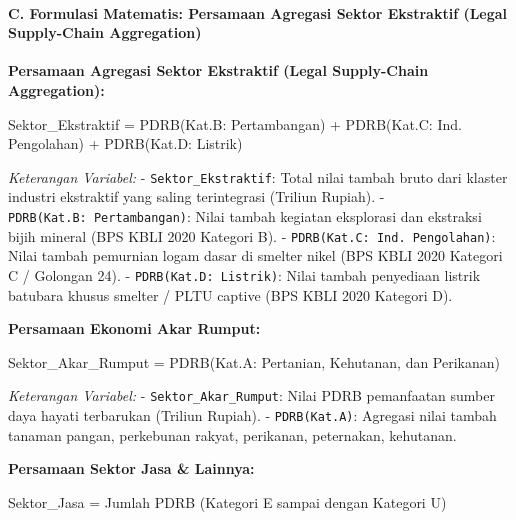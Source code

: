 \documentclass[
]{article}
\newenvironment{Shaded}{}{}
\newcommand{\NormalTok}[1]{#1}
\begin{document}
\paragraph{C. Formulasi Matematis: Persamaan Agregasi Sektor Ekstraktif
(Legal Supply-Chain
Aggregation)}\label{c.-formulasi-matematis-persamaan-agregasi-sektor-ekstraktif-legal-supply-chain-aggregation}

\textbf{Persamaan Agregasi Sektor Ekstraktif (Legal Supply-Chain
Aggregation):}

\begin{Shaded}
\begin{Highlighting}[]
\NormalTok{Sektor\_Ekstraktif = PDRB(Kat.B: Pertambangan) + PDRB(Kat.C: Ind. Pengolahan) + PDRB(Kat.D: Listrik)}
\end{Highlighting}
\end{Shaded}

\emph{Keterangan Variabel:} - \texttt{Sektor\_Ekstraktif}: Total nilai
tambah bruto dari klaster industri ekstraktif yang saling terintegrasi
(Triliun Rupiah). - \texttt{PDRB(Kat.B:\ Pertambangan)}: Nilai tambah
kegiatan eksplorasi dan ekstraksi bijih mineral (BPS KBLI 2020 Kategori
B). - \texttt{PDRB(Kat.C:\ Ind.\ Pengolahan)}: Nilai tambah pemurnian
logam dasar di smelter nikel (BPS KBLI 2020 Kategori C / Golongan 24). -
\texttt{PDRB(Kat.D:\ Listrik)}: Nilai tambah penyediaan listrik batubara
khusus smelter / PLTU captive (BPS KBLI 2020 Kategori D).

\textbf{Persamaan Ekonomi Akar Rumput:}

\begin{Shaded}
\begin{Highlighting}[]
\NormalTok{Sektor\_Akar\_Rumput = PDRB(Kat.A: Pertanian, Kehutanan, dan Perikanan)}
\end{Highlighting}
\end{Shaded}

\emph{Keterangan Variabel:} - \texttt{Sektor\_Akar\_Rumput}: Nilai PDRB
pemanfaatan sumber daya hayati terbarukan (Triliun Rupiah). -
\texttt{PDRB(Kat.A)}: Agregasi nilai tambah tanaman pangan, perkebunan
rakyat, perikanan, peternakan, kehutanan.

\textbf{Persamaan Sektor Jasa \& Lainnya:}

\begin{Shaded}
\begin{Highlighting}[]
\NormalTok{Sektor\_Jasa = Jumlah PDRB (Kategori E sampai dengan Kategori U)}
\end{Highlighting}
\end{Shaded}
\end{document}
